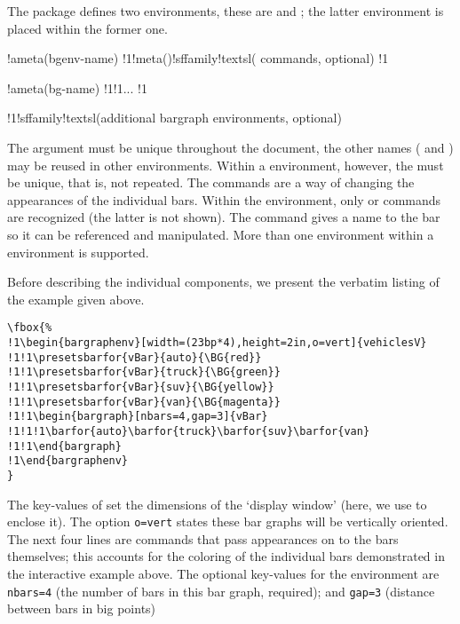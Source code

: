 \documentclass{article}
\edef\amtIndent{\the\parindent}
\begin{document}
The package defines two environments, these are  and
; the latter environment is placed within the former one.
\bVerb{}%
\def\1{\hskip\amtIndent\relax}%
\begin{dCmd}[commandchars=!()]{\bxSize}
\begin{bargraphenv}{!ameta(bgenv-name)}
!1!meta(\presetsbarfor)!sffamily!textsl( commands, optional)
!1\begin{bargraph}{!ameta(bg-name)}
!1!1...
!1\end{bargraph}
!1!sffamily!textsl(additional bargraph environments, optional)
\end{bargraphenv}
\end{dCmd}
\eVerb The  argument must be unique throughout the
document, the other names ( and ) may be
reused in other  environments. Within a 
environment, however, the  must be unique, that is, not repeated. The
 commands are a way of changing the appearances of the
individual bars. Within the  environment, only  or
 commands are recognized (the latter is not shown). The 
command gives a name to the bar so it can be referenced and manipulated. More
than one  environment within a 
environment is supported.

Before describing the individual components, we present the verbatim listing of
the example given above.\def\1{\hskip\amtIndent\relax}
\begin{Verbatim}[fontsize=\small,commandchars={!~@}]
\fbox{%
!1\begin{bargraphenv}[width=(23bp*4),height=2in,o=vert]{vehiclesV}
!1!1\presetsbarfor{vBar}{auto}{\BG{red}}
!1!1\presetsbarfor{vBar}{truck}{\BG{green}}
!1!1\presetsbarfor{vBar}{suv}{\BG{yellow}}
!1!1\presetsbarfor{vBar}{van}{\BG{magenta}}
!1!1\begin{bargraph}[nbars=4,gap=3]{vBar}
!1!1!1\barfor{auto}\barfor{truck}\barfor{suv}\barfor{van}
!1!1\end{bargraph}
!1\end{bargraphenv}
}
\end{Verbatim}
The key-values of  set the dimensions of the `display
window' (here, we use  to enclose it). The option \texttt{o=vert}
states these bar graphs will be vertically oriented. The next four lines are
 commands that pass appearances on to the bars themselves;
this accounts for the coloring of the individual bars demonstrated in the
interactive example above. The optional key-values for the 
environment are \texttt{nbars=4} (the number of bars in this bar graph,
required); and \texttt{gap=3} (distance between bars in big points)
\end{document}
